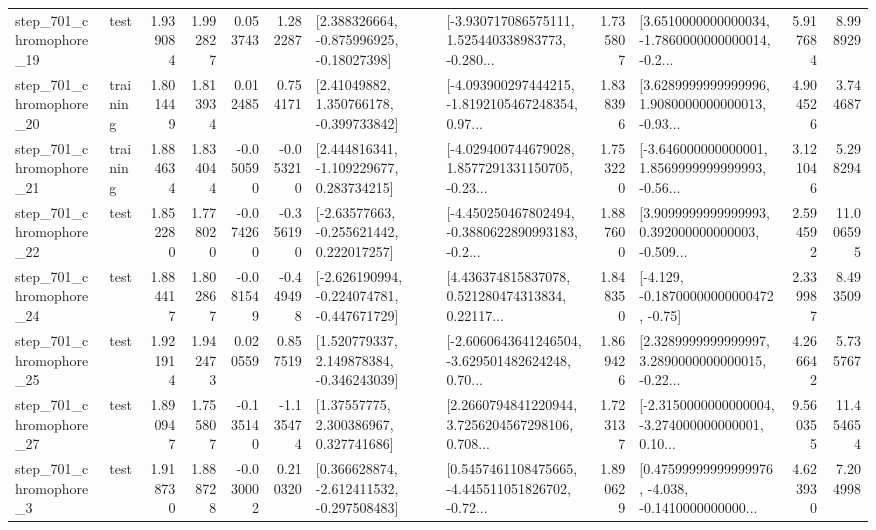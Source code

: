 \begin{tabular}{llrrrrllrlrr}
  step\_701\_chromophore\_19 &      test &      1.939084 &    1.992827 &      0.053743 &  1.282287 &    [2.388326664, -0.875996925, -0.18027398] &  [-3.930717086575111, 1.525440338983773, -0.280... &       1.735807 &  [3.6510000000000034, -1.7860000000000014, -0.2... &            5.917684 &          8.998929 \\
  step\_701\_chromophore\_20 &  training &      1.801449 &    1.813934 &      0.012485 &  0.754171 &     [2.41049882, 1.350766178, -0.399733842] &  [-4.093900297444215, -1.8192105467248354, 0.97... &       1.838396 &  [3.6289999999999996, 1.9080000000000013, -0.93... &            4.904526 &          3.744687 \\
  step\_701\_chromophore\_21 &  training &      1.884634 &    1.834044 &     -0.050590 & -0.053210 &    [2.444816341, -1.109229677, 0.283734215] &  [-4.029400744679028, 1.8577291331150705, -0.23... &       1.753220 &  [-3.646000000000001, 1.8569999999999993, -0.56... &            3.121046 &          5.298294 \\
  step\_701\_chromophore\_22 &      test &      1.852280 &    1.778020 &     -0.074260 & -0.356190 &    [-2.63577663, -0.255621442, 0.222017257] &  [-4.450250467802494, -0.3880622890993183, -0.2... &       1.887600 &  [3.9099999999999993, 0.392000000000003, -0.509... &            2.594592 &         11.006595 \\
  step\_701\_chromophore\_24 &      test &      1.884417 &    1.802867 &     -0.081549 & -0.449498 &  [-2.626190994, -0.224074781, -0.447671729] &  [4.436374815837078, 0.521280474313834, 0.22117... &       1.848350 &              [-4.129, -0.18700000000000472, -0.75] &            2.339987 &          8.493509 \\
  step\_701\_chromophore\_25 &      test &      1.921914 &    1.942473 &      0.020559 &  0.857519 &    [1.520779337, 2.149878384, -0.346243039] &  [-2.6060643641246504, -3.629501482624248, 0.70... &       1.869426 &  [2.3289999999999997, 3.2890000000000015, -0.22... &            4.266642 &          5.735767 \\
  step\_701\_chromophore\_27 &      test &      1.890947 &    1.755807 &     -0.135140 & -1.135474 &      [1.37557775, 2.300386967, 0.327741686] &  [2.2660794841220944, 3.7256204567298106, 0.708... &       1.723137 &  [-2.3150000000000004, -3.274000000000001, 0.10... &            9.560355 &         11.454654 \\
   step\_701\_chromophore\_3 &      test &      1.918730 &    1.888728 &     -0.030002 &  0.210320 &   [0.366628874, -2.612411532, -0.297508483] &  [0.5457461108475665, -4.445511051826702, -0.72... &       1.890629 &  [0.47599999999999976, -4.038, -0.1410000000000... &            4.623930 &          7.204998 \\

\end{tabular}
